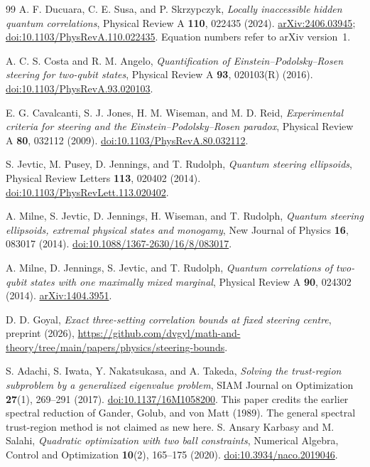 \documentclass[11pt]{article}
\theoremstyle{remark}\newtheorem{remark}[theorem]{Remark}
\begin{document}
\begin{thebibliography}{99}
A. F. Ducuara, C. E. Susa, and P. Skrzypczyk,
\emph{Locally inaccessible hidden quantum correlations},
Physical Review A \textbf{110}, 022435 (2024).
\href{https://arxiv.org/abs/2406.03945}{arXiv:2406.03945};
\href{https://doi.org/10.1103/PhysRevA.110.022435}{doi:10.1103/PhysRevA.110.022435}.
Equation numbers refer to arXiv version~1.

A. C. S. Costa and R. M. Angelo,
\emph{Quantification of Einstein--Podolsky--Rosen steering for two-qubit states},
Physical Review A \textbf{93}, 020103(R) (2016).
\href{https://doi.org/10.1103/PhysRevA.93.020103}{doi:10.1103/PhysRevA.93.020103}.

E. G. Cavalcanti, S. J. Jones, H. M. Wiseman, and M. D. Reid,
\emph{Experimental criteria for steering and the Einstein--Podolsky--Rosen paradox},
Physical Review A \textbf{80}, 032112 (2009).
\href{https://doi.org/10.1103/PhysRevA.80.032112}{doi:10.1103/PhysRevA.80.032112}.

S. Jevtic, M. Pusey, D. Jennings, and T. Rudolph,
\emph{Quantum steering ellipsoids},
Physical Review Letters \textbf{113}, 020402 (2014).
\href{https://doi.org/10.1103/PhysRevLett.113.020402}{doi:10.1103/PhysRevLett.113.020402}.

A. Milne, S. Jevtic, D. Jennings, H. Wiseman, and T. Rudolph,
\emph{Quantum steering ellipsoids, extremal physical states and monogamy},
New Journal of Physics \textbf{16}, 083017 (2014).
\href{https://doi.org/10.1088/1367-2630/16/8/083017}{doi:10.1088/1367-2630/16/8/083017}.

A. Milne, D. Jennings, S. Jevtic, and T. Rudolph,
\emph{Quantum correlations of two-qubit states with one maximally mixed marginal},
Physical Review A \textbf{90}, 024302 (2014).
\href{https://arxiv.org/abs/1404.3951}{arXiv:1404.3951}.

D. D. Goyal,
\emph{Exact three-setting correlation bounds at fixed steering centre},
preprint (2026),
\url{https://github.com/dvgyl/math-and-theory/tree/main/papers/physics/steering-bounds}.

S. Adachi, S. Iwata, Y. Nakatsukasa, and A. Takeda,
\emph{Solving the trust-region subproblem by a generalized eigenvalue problem},
SIAM Journal on Optimization \textbf{27}(1), 269--291 (2017).
\href{https://doi.org/10.1137/16M1058200}{doi:10.1137/16M1058200}.
This paper credits the earlier spectral reduction of Gander, Golub, and
von Matt (1989). The general spectral trust-region method is not claimed
as new here.
S. Ansary Karbasy and M. Salahi,
\emph{Quadratic optimization with two ball constraints},
Numerical Algebra, Control and Optimization \textbf{10}(2), 165--175 (2020).
\href{https://doi.org/10.3934/naco.2019046}{doi:10.3934/naco.2019046}.


\end{thebibliography}
\end{document}
